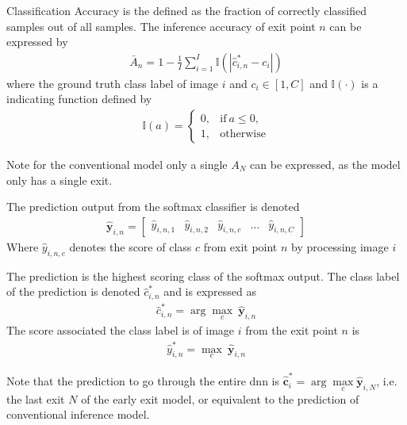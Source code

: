 \begin{enumdescript}
		\item[Classification Accuracy] is the defined as the fraction of correctly classified samples out of all samples. The inference accuracy of exit point $ n $ can be expressed by
		\begin{align}
		\bar{A}_{n}=1-\frac{1}{I} \sum_{i=1}^{I} \mathbb{I}\left(\left|\hat{c}^*_{i,n}-c_{i}\right|\right) \label{eq:accuracy}
		\end{align}
		where the ground truth class label of image $ i $ and $ c_i \in \left[1, C \right] $ and $ \mathbb{I(\cdot)}  $ is a indicating function defined by
		\begin{align}
		\mathbb{I}(a)= \begin{cases}
		0, & \mathrm{if\:} a \leq 0, \\
		1, & \mathrm{otherwise}
		\end{cases}
		\end{align}
		    		
		Note for the conventional model only a single $ A_N $ can be expressed, as the model only has a single exit.
		
		The prediction output from the softmax classifier is denoted
		\begin{align}
			\mathbf{\hat{y}}_{i,n} = \left[\begin{array}{ccccc}\hat{y}_{i,n,1} & \hat{y}_{i,n,2} & \hat{y}_{i,n,c} & \dots & \hat{y}_{i,n,C}\end{array}\right]
		\end{align}
		Where $ \hat{y}_{i,n,c} $ denotes the score of class $ c $ from exit point $ n $ by processing image $ i $
		
		The prediction is the highest scoring class of the softmax output. The class label of the prediction is denoted $ \hat{c}^*_{i,n} $ and is expressed as
		\begin{align}
		\hat{c}^*_{i,n} = \arg \underset{c}{\max}\: \mathbf{\hat{y}}_{i,n}
		\end{align}
		The score associated the class label is of image $ i $ from the exit point $ n $ is
		\begin{align}
		\hat{y}^*_{i,n} = \underset{c}{\max}\: \mathbf{\hat{y}}_{i,n}
		\end{align}
	
		Note that the prediction to go through the entire \gls{dnn} is $ \bm{\hat{c}}^*_i  = \arg \underset{c}{\max} \bm{\hat{y}}_{i,N} $, i.e. the last exit $ N $ of the early exit model, or equivalent to the prediction of conventional inference model.
  

\end{enumdescript}
